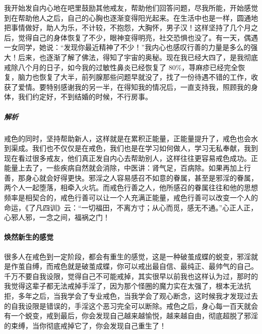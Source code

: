 \begin{case}
    我开始发自内心地在吧里鼓励其他戒友，帮助他们回答问题，尽我所能，开始感觉到在帮助他人之后，自己的心胸也逐渐变得阳光起来。在生活中也是一样，圆通地把事情做好，助人为乐，不计较，不抱怨，大胸怀，男子汉！这样坚持了几个月之后，觉得自己的身体恢复了不少，眼神变得明亮，社交恐惧也没了。有一天，偶遇一女同学，她说：“发现你最近精神了不少！”我内心也感叹行善的力量是多么的强大！后来，也逐渐了解了佛法，得知了宇宙的奥秘。现在我已经大四了，是我彻底戒除八个月的日子，如今我的过敏性鼻炎已经恢复了 80\%，荨麻疹已经完全恢复，脑力也恢复了大半，前列腺那些问题早就没了，找了一份待遇不错的工作，收获了爱情。要特别感谢我的另一半，在得知我的情况后，一直支持我，照顾我的身体，我们约定好，不到结婚的时候，不行房事。
    \subparagraph{解析} 戒色的同时，坚持帮助新人，这样就是在累积正能量，正能量提升了，戒色也会水到渠成。我们也不仅仅是在戒色，我们也是在学习如何做人，学习无私奉献，我到现在看过很多戒友，他们真正发自内心去帮助别人，这样往往更容易戒色成功。正能量上去了，一些疾病自然就会消除，中医讲：肾气足，百病除。如果再加上行善，那身心就会好得更快。邪淫之人容易感召不如意的眷属，甚至是邪淫的眷属，两个人一起堕落，相牵入火坑。而戒色行善之人，他所感召的眷属往往和他的思想频率是相契合的，戒色行善可以让一个人充满正能量，戒色行善可以改变一个人的命运，《了凡四训》云：“一切福田，不离方寸；从心而觅，感无不通。”心正人正，心邪人邪，一念之间，福祸之门！
\end{case}

\paragraph{焕然新生的感觉}

很多人在戒色到一定阶段，都会有重生的感觉，这是一种破茧成蝶的蜕变，邪淫就是作茧自缚，而戒色就是破茧成蝶，你可以戒出最自信、最纯正、最帅气的自己。千万不要自我设限，觉得自己不可能戒掉，其实很早以前我也这样认为过，那时的我觉得这辈子都无法戒掉手淫了，因为那个怪圈的魔力实在太强了，根本无法抗拒，多年之后，当我学会了专业戒色，当我学会了观心断念，这时候我才发现过去的自我设限是错误的，手淫这个恶习完全可以断除。戒色之后，身心每一百天就会有一个蜕变，戒到最后，你会发现自己越来越愉悦，越来越自由，彻底超脱了邪淫的束缚，当你彻底戒掉它了，你会发现自己重生了！

